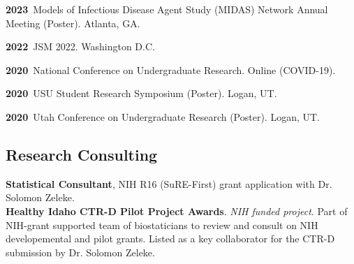 \documentclass[11pt]{article}
\newenvironment {reflist}
                {
                 \begin{list}{}
                 {\setlength{\labelwidth}{0mm}
                  \setlength{\leftmargin}{8mm}
                  \setlength{\itemindent}{-3mm}
                  \setlength{\labelsep}{0mm}
                  \setlength{\parsep}{0.1 ex}
                  \setlength{\itemsep}{0.1cm}
      \setlength{\topsep}{0.15cm}}} %
   {\end{list}}
\begin{document}
\begin{reflist}
    \item \textbf{2023}\, Models of Infectious Disease Agent Study (MIDAS) Network Annual Meeting (Poster). Atlanta, GA.

    \item \textbf{2022}\, JSM 2022. Washington D.C.

     \item \textbf{2020}\, National Conference on Undergraduate Research. Online (COVID-19).

    \item \textbf{2020}\, USU Student Research Symposium (Poster). Logan, UT.

    \item \textbf{2020}\, Utah Conference on Undergraduate Research (Poster). Logan, UT.


\end{reflist}

\subsection*{Research Consulting}

\textbf{Statistical Consultant}, NIH R16 (SuRE-First) grant application with Dr. Solomon Zeleke.\\

\noindent \textbf{Healthy Idaho CTR-D Pilot Project Awards}. \textit{NIH funded project}.
Part of NIH-grant supported team of biostaticians to review and consult on NIH developemental and pilot grants.
Listed as a key collaborator for the CTR-D submission by Dr. Solomon Zeleke.
\end{document}
